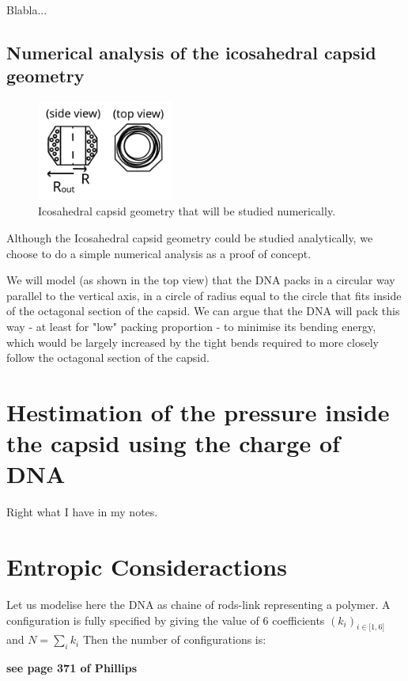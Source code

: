 \documentclass{article}
\begin{document}
Blabla... 

\subsection{Numerical analysis of the icosahedral capsid geometry}

\begin{figure}[H]
    \centering
    \includegraphics[width=0.4\textwidth]{octogonal_geometry.png}
    \caption{Icosahedral capsid geometry that will be studied numerically.}
    \label{fig:enter-label}
\end{figure}

Although the Icosahedral capsid geometry could be studied analytically, we choose to do a simple numerical analysis as a proof of concept.

We will model (as shown in the top view) that the DNA packs in a circular way parallel to the vertical axis, in a circle of radius equal to the circle that fits inside of the octagonal section of the capsid. We can argue that the DNA will pack this way - at least for "low" packing proportion - to minimise its bending energy, which would be largely increased by the tight bends required to more closely follow the octagonal section of the capsid.


\section{Hestimation of the pressure inside the capsid using the charge of DNA}

Right what I have in my notes.

\section{Entropic Consideractions}
Let us modelise here the DNA as chaine of rods-link representing a polymer. A configuration is fully specified by giving the value of 6 coefficients $(k_i)_{i\in \mathbf{[} 1, 6 \mathbf{]}} $ and $N=\sum_i k_i$
Then the number of configurations is:

\textbf{see page 371 of Phillips}
\end{document}
